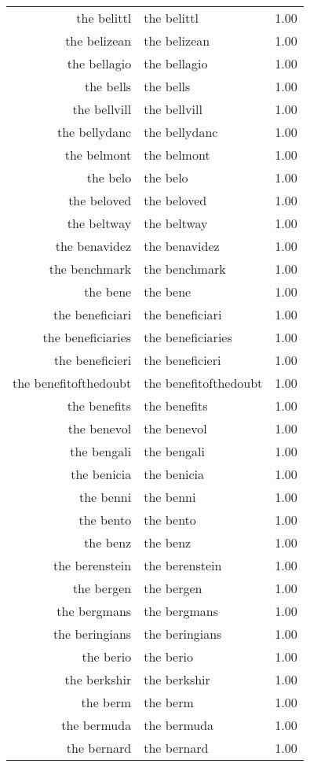 \begin{table}[ht]
\begin{tabular}{rlr}
  the belittl & the belittl & 1.00 \\ 
  the belizean & the belizean & 1.00 \\ 
  the bellagio & the bellagio & 1.00 \\ 
  the bells & the bells & 1.00 \\ 
  the bellvill & the bellvill & 1.00 \\ 
  the bellydanc & the bellydanc & 1.00 \\ 
  the belmont & the belmont & 1.00 \\ 
  the belo & the belo & 1.00 \\ 
  the beloved & the beloved & 1.00 \\ 
  the beltway & the beltway & 1.00 \\ 
  the benavidez & the benavidez & 1.00 \\ 
  the benchmark & the benchmark & 1.00 \\ 
  the bene & the bene & 1.00 \\ 
  the beneficiari & the beneficiari & 1.00 \\ 
  the beneficiaries & the beneficiaries & 1.00 \\ 
  the beneficieri & the beneficieri & 1.00 \\ 
  the benefitofthedoubt & the benefitofthedoubt & 1.00 \\ 
  the benefits & the benefits & 1.00 \\ 
  the benevol & the benevol & 1.00 \\ 
  the bengali & the bengali & 1.00 \\ 
  the benicia & the benicia & 1.00 \\ 
  the benni & the benni & 1.00 \\ 
  the bento & the bento & 1.00 \\ 
  the benz & the benz & 1.00 \\ 
  the berenstein & the berenstein & 1.00 \\ 
  the bergen & the bergen & 1.00 \\ 
  the bergmans & the bergmans & 1.00 \\ 
  the beringians & the beringians & 1.00 \\ 
  the berio & the berio & 1.00 \\ 
  the berkshir & the berkshir & 1.00 \\ 
  the berm & the berm & 1.00 \\ 
  the bermuda & the bermuda & 1.00 \\ 
  the bernard & the bernard & 1.00 \\ 

\end{tabular}
\end{table}
